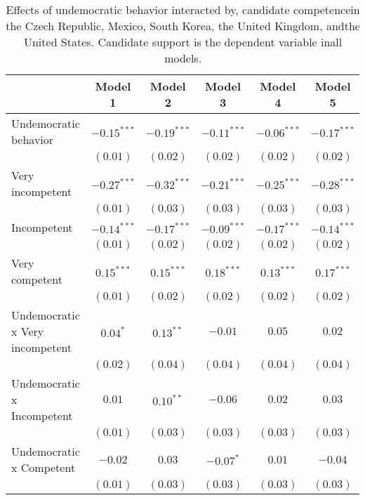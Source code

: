 
\begin{table}[!htbp]
\caption{Effects of undemocratic behavior interacted by, candidate competencein the Czech Republic, Mexico, South Korea, the United Kingdom, andthe United States. Candidate support is the dependent variable inall models.}
\begin{center}
\begin{tabular}{l c c c c c}
\hline
 & Model 1 & Model 2 & Model 3 & Model 4 & Model 5 \\
\hline
Undemocratic behavior           & $-0.15^{***}$ & $-0.19^{***}$ & $-0.11^{***}$ & $-0.06^{***}$ & $-0.17^{***}$ \\
                                & $(0.01)$      & $(0.02)$      & $(0.02)$      & $(0.02)$      & $(0.02)$      \\
Very incompetent                & $-0.27^{***}$ & $-0.32^{***}$ & $-0.21^{***}$ & $-0.25^{***}$ & $-0.28^{***}$ \\
                                & $(0.01)$      & $(0.03)$      & $(0.03)$      & $(0.03)$      & $(0.03)$      \\
Incompetent                     & $-0.14^{***}$ & $-0.17^{***}$ & $-0.09^{***}$ & $-0.17^{***}$ & $-0.14^{***}$ \\
                                & $(0.01)$      & $(0.02)$      & $(0.02)$      & $(0.02)$      & $(0.02)$      \\
Very competent                  & $0.15^{***}$  & $0.15^{***}$  & $0.18^{***}$  & $0.13^{***}$  & $0.17^{***}$  \\
                                & $(0.01)$      & $(0.02)$      & $(0.02)$      & $(0.02)$      & $(0.02)$      \\
Undemocratic x Very incompetent & $0.04^{*}$    & $0.13^{**}$   & $-0.01$       & $0.05$        & $0.02$        \\
                                & $(0.02)$      & $(0.04)$      & $(0.04)$      & $(0.04)$      & $(0.04)$      \\
Undemocratic x Incompetent      & $0.01$        & $0.10^{**}$   & $-0.06$       & $0.02$        & $0.03$        \\
                                & $(0.01)$      & $(0.03)$      & $(0.03)$      & $(0.03)$      & $(0.03)$      \\
Undemocratic x Competent        & $-0.02$       & $0.03$        & $-0.07^{*}$   & $0.01$        & $-0.04$       \\
                                & $(0.01)$      & $(0.03)$      & $(0.03)$      & $(0.03)$      & $(0.03)$      \\

\end{tabular}
\end{center}
\end{table}

